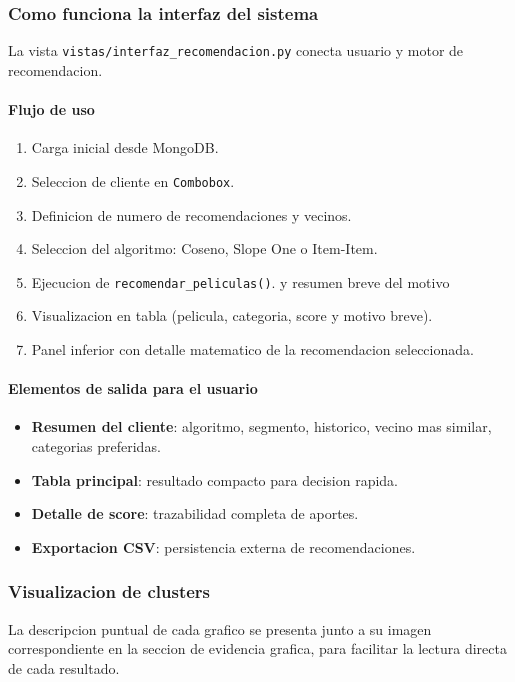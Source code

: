 ﻿\documentclass{article}
\begin{document}
\subsubsection{Como funciona la interfaz del sistema}
La vista \texttt{vistas/interfaz\_recomendacion.py} conecta usuario y motor de recomendacion.

\paragraph{Flujo de uso}
\begin{enumerate}
    \item Carga inicial desde MongoDB.
    \item Seleccion de cliente en \texttt{Combobox}.
    \item Definicion de numero de recomendaciones y vecinos.
    \item Seleccion del algoritmo: Coseno, Slope One o Item-Item.
    \item Ejecucion de \texttt{recomendar\_peliculas()}. y resumen breve del motivo
    \item Visualizacion en tabla (pelicula, categoria, score y motivo breve).
    \item Panel inferior con detalle matematico de la recomendacion seleccionada.
\end{enumerate}

\paragraph{Elementos de salida para el usuario}
\begin{itemize}
    \item \textbf{Resumen del cliente}: algoritmo, segmento, historico, vecino mas similar, categorias preferidas.
    \item \textbf{Tabla principal}: resultado compacto para decision rapida.
    \item \textbf{Detalle de score}: trazabilidad completa de aportes.
    \item \textbf{Exportacion CSV}: persistencia externa de recomendaciones.
\end{itemize}

\subsubsection{Visualizacion de clusters}
La descripcion puntual de cada grafico se presenta junto a su imagen correspondiente en la seccion de evidencia grafica, para facilitar la lectura directa de cada resultado.
\end{document}
